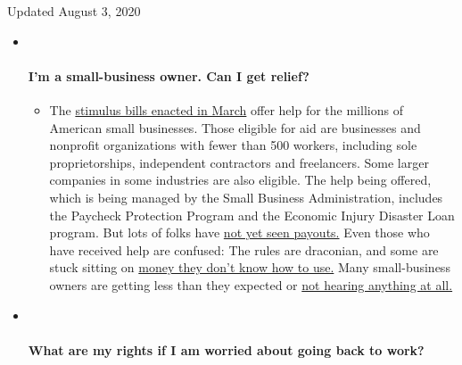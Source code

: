 Updated August 3, 2020

\begin{itemize}
\item ~
  \hypertarget{im-a-small-business-owner-can-i-get-relief}{%
  \paragraph{I'm a small-business owner. Can I get
  relief?}\label{im-a-small-business-owner-can-i-get-relief}}

  \begin{itemize}
  \tightlist
  \item
    The
    \href{https://www.nytimes3xbfgragh.onion/article/small-business-loans-stimulus-grants-freelancers-coronavirus.html?action=click\&pgtype=Article\&state=default\&region=MAIN_CONTENT_3\&context=storylines_faq}{stimulus
    bills enacted in March} offer help for the millions of American
    small businesses. Those eligible for aid are businesses and
    nonprofit organizations with fewer than 500 workers, including sole
    proprietorships, independent contractors and freelancers. Some
    larger companies in some industries are also eligible. The help
    being offered, which is being managed by the Small Business
    Administration, includes the Paycheck Protection Program and the
    Economic Injury Disaster Loan program. But lots of folks have
    \href{https://www.nytimes3xbfgragh.onion/interactive/2020/05/07/business/small-business-loans-coronavirus.html?action=click\&pgtype=Article\&state=default\&region=MAIN_CONTENT_3\&context=storylines_faq}{not
    yet seen payouts.} Even those who have received help are confused:
    The rules are draconian, and some are stuck sitting on
    \href{https://www.nytimes3xbfgragh.onion/2020/05/02/business/economy/loans-coronavirus-small-business.html?action=click\&pgtype=Article\&state=default\&region=MAIN_CONTENT_3\&context=storylines_faq}{money
    they don't know how to use.} Many small-business owners are getting
    less than they expected or
    \href{https://www.nytimes3xbfgragh.onion/2020/06/10/business/Small-business-loans-ppp.html?action=click\&pgtype=Article\&state=default\&region=MAIN_CONTENT_3\&context=storylines_faq}{not
    hearing anything at all.}
  \end{itemize}
\item ~
  \hypertarget{what-are-my-rights-if-i-am-worried-about-going-back-to-work}{%
  \paragraph{What are my rights if I am worried about going back to
  work?}\label{what-are-my-rights-if-i-am-worried-about-going-back-to-work}}


\end{itemize}
